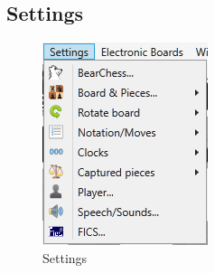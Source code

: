 \documentclass[11pt,a4paper]{article}
\begin{document}
	\subsection{Settings}
	\begin{figure}[H]
		\centering
		\includegraphics[scale=1.0]{Settings.png}
		\caption{Settings}
		\label{fig:Settings}
	\end{figure}
\end{document}
